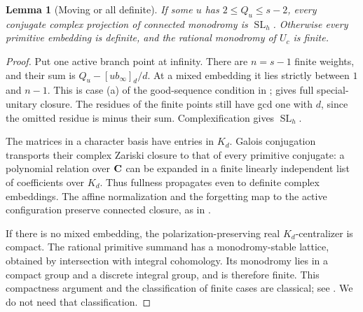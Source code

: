\documentclass[11pt]{article}
\newtheorem{lemma}[theorem]{Lemma}
\theoremstyle{remark}\newtheorem{remark}[theorem]{Remark}
\DeclareMathOperator{\SL}{SL}\DeclareMathOperator{\Sp}{Sp}
\begin{document}
\begin{lemma}[Moving or all definite]\label{lem:dichotomy}
If some $u$ has $2\leq Q_u\leq s-2$, every conjugate complex projection
of connected monodromy is $\SL_h$. Otherwise every primitive embedding
is definite, and the rational monodromy of $U_c$ is finite.
\end{lemma}
\begin{proof}
Put one active branch point at infinity. There are $n=s-1$ finite
weights, and their sum is $Q_u-[ub_\infty]_d/d$. At a mixed embedding
it lies strictly between $1$ and $n-1$. This is case (a) of the good-sequence
condition in \cite[Definition 1.1]{MN}; \cite[Theorem 5.1]{MN} gives full
special-unitary closure. The residues of the finite points still have gcd
one with $d$, since the omitted residue is minus their sum.
Complexification gives $\SL_h$.

The matrices in a character basis have entries in $K_d$. Galois conjugation
transports their complex Zariski closure to that of every primitive conjugate:
a polynomial relation over $\mathbf C$ can be expanded in a finite linearly
independent list of coefficients over $K_d$. Thus fullness propagates even
to definite complex embeddings. The affine normalization and the forgetting
map to the active configuration preserve connected closure, as in
\cite[Sections 2--3]{General}.

If there is no mixed embedding, the polarization-preserving real
$K_d$-centralizer is compact. The rational primitive summand has a
monodromy-stable lattice, obtained by intersection with integral cohomology.
Its monodromy lies in a compact group and a discrete integral group, and
is therefore finite. This compactness argument and the classification of
finite cases are classical; see \cite[Theorem 8 and Lemma 11]{GV}.
We do not need that classification.
\end{proof}
\end{document}
